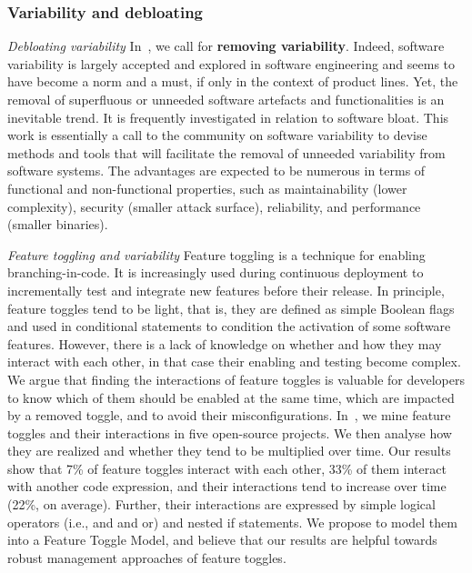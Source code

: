 \subsubsection{Variability and debloating}

\emph{Debloating variability} In~\cite{acher:hal-03882594}, we call for \textbf{removing variability}. Indeed, software variability is largely accepted and explored in software engineering and seems to have become a norm and a must, if only in the context of product lines. Yet, the removal of superfluous or unneeded software artefacts and functionalities is an inevitable trend. It is frequently investigated in relation to software bloat. This work is essentially a call to the community on software variability to devise methods and tools that will facilitate the removal of unneeded variability from software systems. The advantages are expected to be numerous in terms of functional and non-functional properties, such as maintainability (lower complexity), security (smaller attack surface), reliability, and performance (smaller binaries).

\emph{Feature toggling and variability} Feature toggling is a technique for enabling branching-in-code. It is increasingly used during continuous deployment to incrementally test and integrate new features before their release. In principle, feature toggles tend to be light, that is, they are defined as simple Boolean flags and used in conditional statements to condition the activation of some software features. However, there is a lack of knowledge on whether and how they may interact with each other, in that case their enabling and testing become complex. We argue that finding the interactions of feature toggles is valuable for developers to know which of them should be enabled at the same time, which are impacted by a removed toggle, and to avoid their misconfigurations. In~\cite{ternava:hal-03527250}, we mine feature toggles and their interactions in five open-source projects. We then analyse how they are realized and whether they tend to be multiplied over time. Our results show that 7\% of feature toggles interact with each other, 33\% of them interact with another code expression, and their interactions tend to increase over time (22\%, on average). Further, their interactions are expressed by simple logical operators (i.e., and and or) and nested if statements. We propose to model them into a Feature Toggle Model, and believe that our results are helpful towards robust management approaches of feature toggles.

